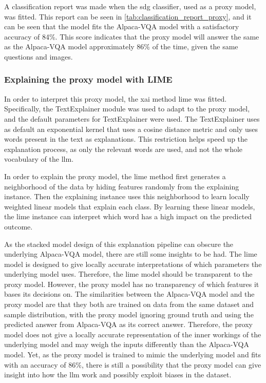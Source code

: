     A classification report was made when the \gls{sdg} classifier, used as a proxy model, was fitted. This report can be seen in \autoref{tab:classification_report_proxy}, and it can be seen that the model fits the Alpaca-VQA model with a satisfactory accuracy of 84\%. This score indicates that the proxy model will answer the same as the Alpaca-VQA model approximately 86\% of the time, given the same questions and images.

    


    \subsubsection{Explaining the proxy model with LIME}
    
    In order to interpret this proxy model, the \gls{xai} method \gls{lime} was fitted. Specifically, the TextExplainer module \cite{LimePackageLime} was used to adapt to the proxy model, and the default parameters for TextExplainer were used. The TextExplainer uses as default an exponential kernel that uses a cosine distance metric and only uses words present in the text as explanations. This restriction helps speed up the explanation process, as only the relevant words are used, and not the whole vocabulary of the \gls{llm}. 

    In order to explain the proxy model, the \gls{lime} method first generates a neighborhood of the data by hiding features randomly from the explaining instance. Then the explaining instance uses this neighborhood to learn locally weighted linear models that explain each class. By learning these linear models, the \gls{lime} instance can interpret which word has a high impact on the predicted outcome. 
    
    
    As the stacked model design of this explanation pipeline can obscure the underlying Alpaca-VQA model, there are still some insights to be had. The \gls{lime} model is designed to give locally accurate interpretations of which parameters the underlying model uses. Therefore, the \gls{lime} model should be transparent to the proxy model. However, the proxy model has no transparency of which features it bases its decisions on. 
    The similarities between the Alpaca-VQA model and the proxy model are that they both are trained on data from the same dataset and sample distribution, with the proxy model ignoring ground truth and using the predicted answer from Alpaca-VQA as its correct answer. 
    Therefore, the proxy model does not give a locally accurate representation of the inner workings of the underlying model and may weigh the inputs differently than the Alpaca-VQA model. 
    Yet, as the proxy model is trained to mimic the underlying model and fits with an accuracy of 86\%, there is still a possibility that the proxy model can give insight into how the \gls{llm} work and possibly exploit biases in the dataset.

